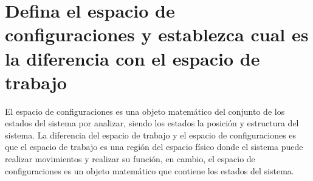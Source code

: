 \section{Defina el espacio de configuraciones y establezca cual es la diferencia con el espacio de trabajo}
El espacio de configuraciones es una objeto matemático del conjunto de los estados del sistema por analizar, siendo los estados la posición y estructura del sistema. La diferencia del espacio de trabajo y el espacio de configuraciones es que el espacio de trabajo es una región del espacio físico donde el sistema puede realizar movimientos y realizar su función, en cambio, el espacio de configuraciones es un objeto matemático que contiene los estados del sistema.